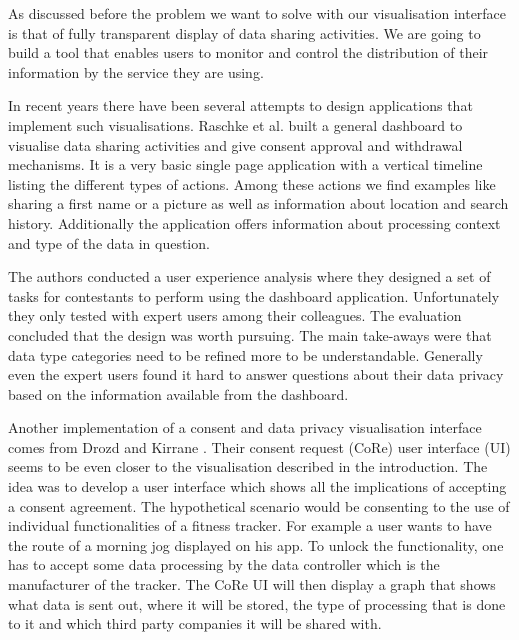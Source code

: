 
  As discussed before the problem we want to solve with our visualisation interface is that of fully transparent display of data sharing activities. We are going to build a tool that enables users to monitor and control the distribution of their information by the service they are using. 
  
  In recent years there have been several attempts to design applications that implement such visualisations. Raschke et al. \cite{core_privacy_dashboard_2018} built a general dashboard to visualise data sharing activities and give consent approval and withdrawal mechanisms. It is a very basic single page application with a vertical timeline listing the different types of actions. Among these actions we find examples like sharing a first name or a picture as well as information about location and search history. Additionally the application offers information about processing context and type of the data in question.
  
  The authors conducted a user experience analysis where they designed a set of tasks for contestants to perform using the dashboard application. Unfortunately they only tested with expert users among their colleagues. The evaluation concluded that the design was worth pursuing. The main take-aways were that data type categories need to be refined more to be understandable. Generally even the expert users found it hard to answer questions about their data privacy based on the information available from the dashboard.
  
  Another implementation of a consent and data privacy visualisation interface comes from Drozd and Kirrane \cite{cure2020}. Their consent request (CoRe) user interface (UI) seems to be even closer to the visualisation described in the introduction.
  The idea was to develop a user interface which shows all the implications of accepting a consent agreement. The hypothetical scenario would be consenting to the use of individual functionalities of a fitness tracker. For example a user wants to have the route of a morning jog displayed on his app. To unlock the functionality, one has to accept some data processing by the data controller which is the manufacturer of the tracker. The CoRe UI will then display a graph that shows what data is sent out, where it will be stored, the type of processing that is done to it and which third party companies it will be shared with.
  
